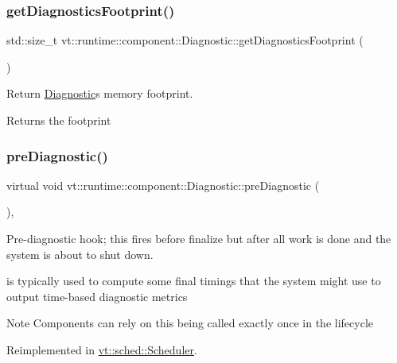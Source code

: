 \subsubsection{\texorpdfstring{get\+Diagnostics\+Footprint()}{getDiagnosticsFootprint()}}
{\footnotesize\ttfamily std\+::size\+\_\+t vt\+::runtime\+::component\+::\+Diagnostic\+::get\+Diagnostics\+Footprint (\begin{DoxyParamCaption}{ }\end{DoxyParamCaption})}



Return \hyperlink{structvt_1_1runtime_1_1component_1_1_diagnostic}{Diagnostic}\textquotesingle{}s memory footprint. 

\begin{DoxyReturn}{Returns}
the footprint 
\end{DoxyReturn}
\mbox{\label{structvt_1_1runtime_1_1component_1_1_diagnostic_a4e64b5a12ffc1874065aa8b09e6309a9}} 
\subsubsection{\texorpdfstring{pre\+Diagnostic()}{preDiagnostic()}}
{\footnotesize\ttfamily virtual void vt\+::runtime\+::component\+::\+Diagnostic\+::pre\+Diagnostic (\begin{DoxyParamCaption}{ }\end{DoxyParamCaption})\hspace{0.3cm}{\ttfamily [inline]}, {\ttfamily [virtual]}}



Pre-\/diagnostic hook; this fires before finalize but after all work is done and the system is about to shut down. 

is typically used to compute some final timings that the system might use to output time-\/based diagnostic metrics

\begin{DoxyNote}{Note}
Components can rely on this being called exactly once in the lifecycle 
\end{DoxyNote}


Reimplemented in \hyperlink{structvt_1_1sched_1_1_scheduler_a42835a58f541dd65cecd4d393fe78a81}{vt\+::sched\+::\+Scheduler}.

